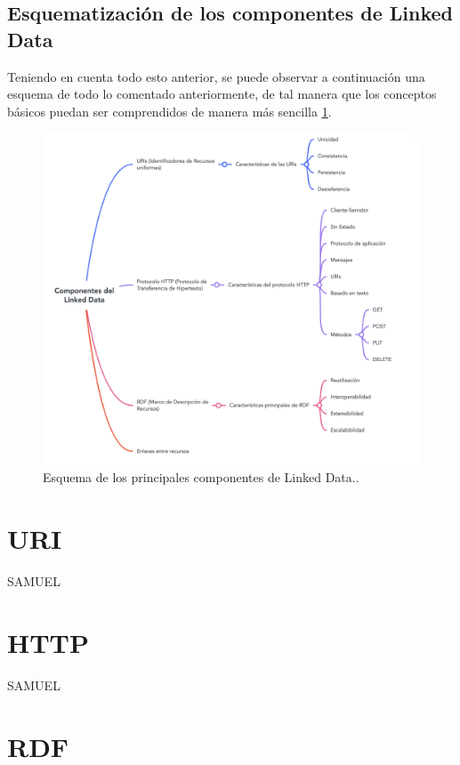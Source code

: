 \documentclass[11pt]{report}
\begin{document}
\section{Esquematización de los componentes de Linked Data}

Teniendo en cuenta todo esto anterior, se puede observar a continuación una esquema de todo lo comentado anteriormente, de tal manera que los conceptos básicos puedan ser comprendidos de manera más sencilla \ref{fig:Componentes-Linked-Data}.

\begin{figure}[H]
	\centering
	\includegraphics[scale=0.6]{../img/Componentes-Linked-Data.png}
	\caption{Esquema de los principales componentes de Linked Data..}
	\label{fig:Componentes-Linked-Data}
\end{figure}

\chapter{URI}
	SAMUEL	
	
	\chapter{HTTP}
	SAMUEL

	\chapter{RDF}
\end{document}
